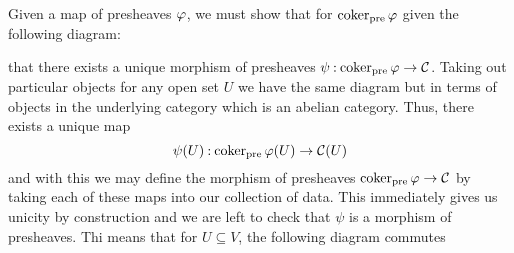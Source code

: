 \documentclass[12pt]{memoir}
\begin{document}
 \begin{ptcbr}
    Given a map of presheaves $\varphi$, we must show that for $\operatorname{coker}_{\text{pre}}\varphi$ given the following diagram:
    \begin{center}
    \end{center}
    that there exists a unique morphism of presheaves $\psi\mathbin{:}\operatorname{coker}_{\text{pre}}\varphi\to \mathcal{C}$. Taking out particular objects for any open set $U$ we have the same diagram but in terms of objects in the underlying category which is an abelian category. Thus, there exists a unique map 
    $$\psi(U)\mathbin{:}\operatorname{coker}_{\text{pre}}\varphi(U)\to\mathcal{C}(U)$$
    and with this we may define the morphism of presheaves $\operatorname{coker}_{\text{pre}}\varphi\to \mathcal{C}$ by taking each of these maps into our collection of data. This immediately gives us unicity by construction and we are left to check that $\psi$ is a morphism of presheaves. Thi means that for $U\subseteq V$, the following diagram commutes
    \begin{center}
\end{center}
\end{ptcbr}
\end{document}
